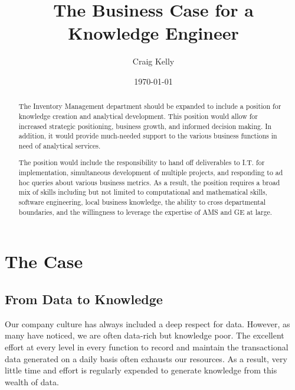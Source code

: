 \documentclass[letterpaper]{article}
\title{The Business Case for a Knowledge Engineer}
\author{Craig Kelly}
\date{\today}
\begin{document}
\setlength{\pdfpageheight}{\paperheight}
\setlength{\pdfpagewidth}{\paperwidth}


\maketitle

\begin{abstract}
The Inventory Management department should be expanded to include a position
for knowledge creation and analytical development.  This position would allow
for increased strategic positioning, business growth, and informed decision
making.  In addition, it would provide much-needed support to the various
business functions in need of analytical services.

The position would include the responsibility to hand off deliverables
to I.T. for implementation, simultaneous development of multiple projects, and
responding to ad hoc queries about various business metrics.
As a result, the position requires a broad mix of skills including but
not limited to computational and mathematical skills, software engineering,
local business knowledge, the ability to cross departmental boundaries, and
the willingness to leverage the expertise of AMS and GE at large.
\end{abstract}



\section{The Case}

    \subsection{From Data to Knowledge}

    Our company culture has always included a deep respect for data.  However,
    as many have noticed, we are often data-rich but knowledge poor.  The
    excellent effort at every level in every function to record and maintain
    the transactional data generated on a daily basis often exhausts our
    resources.  As a result, very little time and effort is regularly expended
    to generate knowledge from this wealth of data.
\end{document}
